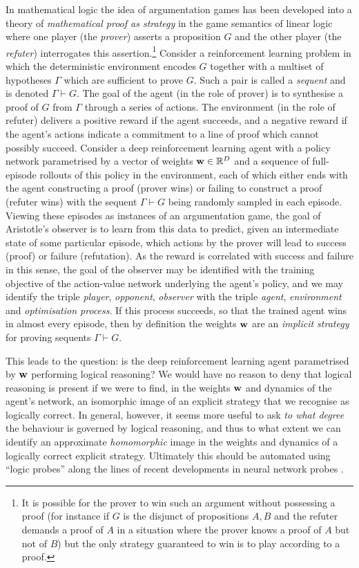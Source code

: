 \documentclass{article} %
\begin{document}
In mathematical logic the idea of argumentation games has been developed into a theory of \emph{mathematical proof as strategy} in the game semantics of linear logic \citep{hylandgame} where one player (the \emph{prover}) asserts a proposition $G$ and the other player (the \emph{refuter}) interrogates this assertion.\footnote{It is possible for the prover to win such an argument without possessing a proof (for instance if $G$ is the disjunct of propositions $A, B$ and the refuter demands a proof of $A$ in a situation where the prover knows a proof of $A$ but not of $B$) but the only strategy guaranteed to win is to play according to a proof.} Consider a reinforcement learning problem \citep{suttonbarto} in which the deterministic environment encodes $G$ together with a multiset of hypotheses $\Gamma$ which are sufficient to prove $G$. Such a pair is called a \emph{sequent} and is denoted $\Gamma \vdash G$.  The goal of the agent (in the role of prover) is to synthesise a proof of $G$ from $\Gamma$ through a series of actions. The environment (in the role of refuter) delivers a positive reward if the agent succeeds, and a negative reward if the agent's actions indicate a commitment to a line of proof which cannot possibly succeed. Consider a deep reinforcement learning agent with a policy network parametrised by a vector of weights $\bold{w} \in \mathbb{R}^D$ and a sequence of full-episode rollouts of this policy in the environment, each of which either ends with the agent constructing a proof (prover wins) or failing to construct a proof (refuter wins) with the sequent $\Gamma \vdash G$ being randomly sampled in each episode. Viewing these episodes as instances of an argumentation game, the goal of Aristotle's observer is to learn from this data to predict, given an intermediate state of some particular episode, which actions by the prover will lead to success (proof) or failure (refutation). As the reward is correlated with success and failure in this sense, the goal of the observer may be identified with the training objective of the action-value network underlying the agent's policy, and we may identify the triple \emph{player}, \emph{opponent}, \emph{observer} with the triple \emph{agent}, \emph{environment} and \emph{optimisation process}. If this process succeeds, so that the trained agent wins in almost every episode, then by definition the weights $\bold{w}$ are an \emph{implicit strategy} for proving sequents $\Gamma \vdash G$.

This leads to the question: is the deep reinforcement learning agent parametrised by $\bold{w}$ performing logical reasoning? We would have no reason to deny that logical reasoning is present if we were to find, in the weights $\bold{w}$ and dynamics of the agent's network, an isomorphic image of an explicit strategy that we recognise as logically correct. In general, however, it seems more useful to ask \emph{to what degree} the behaviour is governed by logical reasoning, and thus to what extent we can identify an approximate \emph{homomorphic} image in the weights and dynamics of a logically correct explicit strategy. Ultimately this should be automated using ``logic probes'' along the lines of recent developments in neural network probes \citep{alain, koh, nguyen, srikumar, simonyan}.
\end{document}
